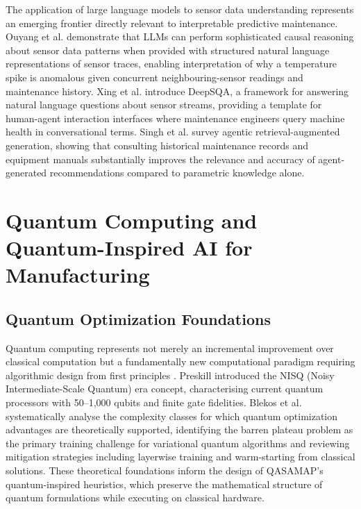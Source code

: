 The application of large language models to sensor data understanding represents an emerging frontier directly relevant to interpretable predictive maintenance. Ouyang et al. \cite{ouyang_llmsense_2024} demonstrate that LLMs can perform sophisticated causal reasoning about sensor data patterns when provided with structured natural language representations of sensor traces, enabling interpretation of why a temperature spike is anomalous given concurrent neighbouring-sensor readings and maintenance history. Xing et al. \cite{xing_deepsqa_2021} introduce DeepSQA, a framework for answering natural language questions about sensor streams, providing a template for human-agent interaction interfaces where maintenance engineers query machine health in conversational terms. Singh et al. \cite{singh_agentic_2025} survey agentic retrieval-augmented generation, showing that consulting historical maintenance records and equipment manuals substantially improves the relevance and accuracy of agent-generated recommendations compared to parametric knowledge alone.

\section{Quantum Computing and Quantum-Inspired AI for Manufacturing}



\subsection{Quantum Optimization Foundations}

Quantum computing represents not merely an incremental improvement over classical computation but a fundamentally new computational paradigm requiring algorithmic design from first principles \cite{eldh_quantum_2025}. Preskill \cite{Preskill2018} introduced the NISQ (Noisy Intermediate-Scale Quantum) era concept, characterising current quantum processors with 50--1,000 qubits and finite gate fidelities. Blekos et al. \cite{Blekos2024} systematically analyse the complexity classes for which quantum optimization advantages are theoretically supported, identifying the barren plateau problem as the primary training challenge for variational quantum algorithms and reviewing mitigation strategies including layerwise training and warm-starting from classical solutions. These theoretical foundations inform the design of QASAMAP's quantum-inspired heuristics, which preserve the mathematical structure of quantum formulations while executing on classical hardware.

